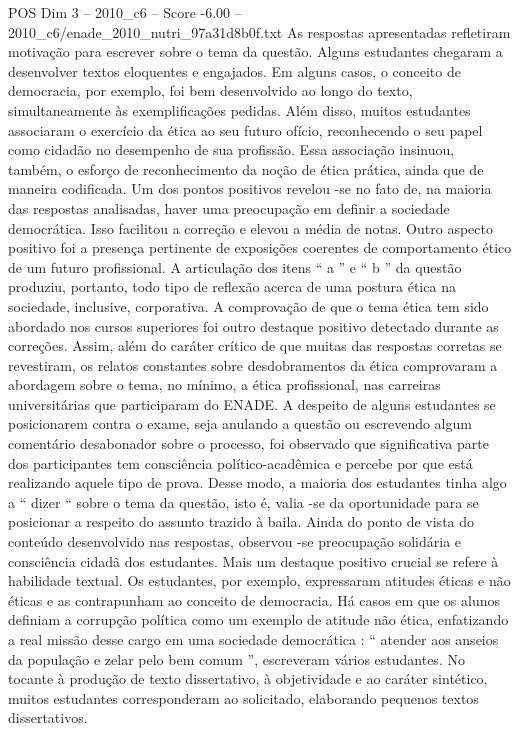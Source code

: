 \begin{textsample}{POS Dim 3 – 2010\_c6 – Score -6.00 – 2010\_c6/enade\_2010\_nutri\_97a31d8b0f.txt}
As respostas apresentadas refletiram motivação para escrever sobre o tema da questão.
Alguns estudantes chegaram a desenvolver textos eloquentes e engajados.
Em alguns casos, o conceito de democracia, por exemplo, foi bem desenvolvido ao longo do texto, simultaneamente às exemplificações pedidas.
Além disso, muitos estudantes associaram o exercício da ética ao seu futuro ofício, reconhecendo o seu papel como cidadão no desempenho de sua profissão.
Essa associação insinuou, também, o esforço de reconhecimento da noção de ética prática, ainda que de maneira codificada.
Um dos pontos positivos revelou -se no fato de, na maioria das respostas analisadas, haver uma preocupação em definir a sociedade democrática.
Isso facilitou a correção e elevou a média de notas.
Outro aspecto positivo foi a presença pertinente de exposições coerentes de comportamento ético de um futuro profissional.
A articulação dos itens “ a ” e “ b ” da questão produziu, portanto, todo tipo de reflexão acerca de uma postura ética na sociedade, inclusive, corporativa.
A comprovação de que o tema ética tem sido abordado nos cursos superiores foi outro destaque positivo detectado durante as correções.
Assim, além do caráter crítico de que muitas das respostas corretas se revestiram, os relatos constantes sobre desdobramentos da ética comprovaram a abordagem sobre o tema, no mínimo, a ética profissional, nas carreiras universitárias que participaram do ENADE.
A despeito de alguns estudantes se posicionarem contra o exame, seja anulando a questão ou escrevendo algum comentário desabonador sobre o processo, foi observado que significativa parte dos participantes tem consciência político-acadêmica e percebe por que está realizando aquele tipo de prova.
Desse modo, a maioria dos estudantes tinha algo a “ dizer “ sobre o tema da questão, isto é, valia -se da oportunidade para se posicionar a respeito do assunto trazido à baila.
Ainda do ponto de vista do conteúdo desenvolvido nas respostas, observou -se preocupação solidária e consciência cidadã dos estudantes.
Mais um destaque positivo crucial se refere à habilidade textual.
Os estudantes, por exemplo, expressaram atitudes éticas e não éticas e as contrapunham ao conceito de democracia.
Há casos em que os alunos definiam a corrupção política como um exemplo de atitude não ética, enfatizando a real missão desse cargo em uma sociedade democrática : “ atender aos anseios da população e zelar pelo bem comum ”, escreveram vários estudantes.
No tocante à produção de texto dissertativo, à objetividade e ao caráter sintético, muitos estudantes corresponderam ao solicitado, elaborando pequenos textos dissertativos.

\end{textsample}
